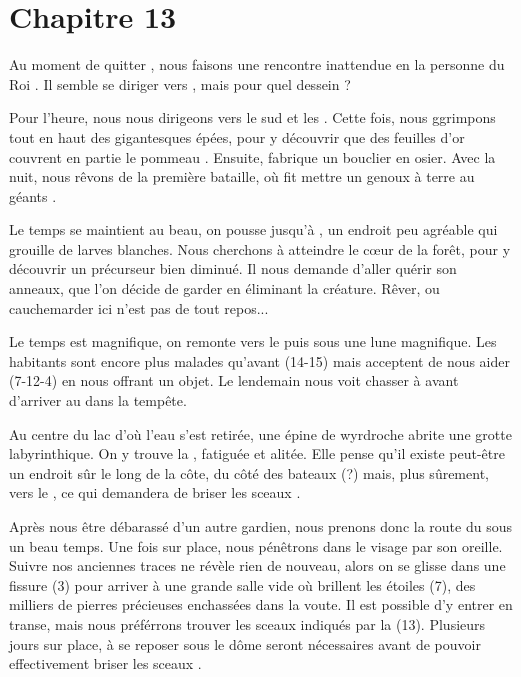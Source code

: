 \documentclass[11pt]{article}
\begin{document}
{%
\section{Chapitre 13}

Au moment de quitter \cuanachtdevaste{}, nous faisons une rencontre inattendue en la personne du Roi \arthur{}. Il semble se diriger vers \camelot{}, mais pour quel dessein ?


Pour l'heure, nous nous dirigeons vers le sud et les \lames{}. Cette fois, nous ggrimpons tout en haut des gigantesques épées, pour y découvrir que des feuilles d'or couvrent en partie le pommeau . Ensuite, \beor{} fabrique un bouclier en osier. Avec la nuit, nous rêvons de la première bataille, où \arthur{} fit mettre un genoux à terre au géants .

Le temps se maintient au beau, on pousse jusqu'à \larvebois{}, un endroit peu agréable qui grouille de larves blanches. Nous cherchons à atteindre le c\oe{}ur de la forêt, pour y découvrir un précurseur bien diminué. Il nous demande d'aller quérir son anneaux, que l'on décide de garder en éliminant la créature. Rêver, ou cauchemarder ici n'est pas de tout repos...

Le temps est magnifique, on remonte vers le \bosquet{} puis \blanc{} sous une lune magnifique. Les habitants sont encore plus malades qu'avant (14-15)  mais acceptent de nous aider (7-12-4) en nous offrant un objet. Le lendemain nous voit chasser à \tordracine{} avant d'arriver au \lacsec{} dans la tempête.

Au centre du lac d'où l'eau s'est retirée, une épine de wyrdroche abrite une grotte labyrinthique. On y trouve la \dame{}, fatiguée et alitée. Elle pense qu'il existe peut-être un endroit sûr le long de la côte, du côté des bateaux (?) mais, plus sûrement, vers le \visageserein{}, ce qui demandera de briser les sceaux .


Après nous être débarassé d'un autre gardien, nous prenons donc la route du \visageserein{} sous un beau temps. Une fois sur place, nous pénêtrons dans le visage par son oreille. Suivre nos anciennes traces ne révèle rien de nouveau, alors on se glisse dans une fissure (3) pour arriver à une grande salle vide où brillent les étoiles (7), des milliers de pierres précieuses enchassées dans la voute. Il est possible d'y entrer en transe, mais nous préférrons trouver les sceaux indiqués par la \dame{} (13). Plusieurs jours sur place, à se reposer sous le dôme \gain{\magic[2]]\index{Gain!Magie}, \terror[-2]\index{Gain!Terreur}} seront nécessaires avant de pouvoir effectivement briser les sceaux .

}
\end{document}
